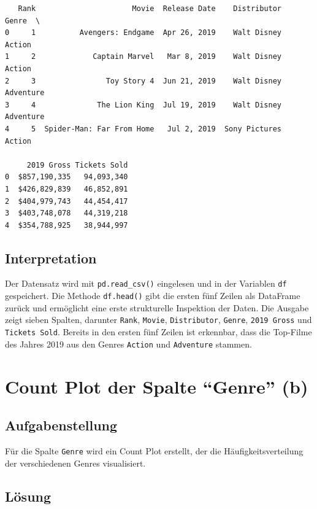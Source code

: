 \begin{verbatim}
   Rank                      Movie  Release Date    Distributor      Genre  \
0     1          Avengers: Endgame  Apr 26, 2019    Walt Disney     Action   
1     2             Captain Marvel   Mar 8, 2019    Walt Disney     Action   
2     3                Toy Story 4  Jun 21, 2019    Walt Disney  Adventure   
3     4              The Lion King  Jul 19, 2019    Walt Disney  Adventure   
4     5  Spider-Man: Far From Home   Jul 2, 2019  Sony Pictures     Action   

     2019 Gross Tickets Sold  
0  $857,190,335   94,093,340  
1  $426,829,839   46,852,891  
2  $404,979,743   44,454,417  
3  $403,748,078   44,319,218  
4  $354,788,925   38,944,997
\end{verbatim}

\subsection{Interpretation}

Der Datensatz wird mit \texttt{pd.read\_csv()} eingelesen und in der Variablen \texttt{df} gespeichert. Die Methode \texttt{df.head()} gibt die ersten fünf Zeilen als DataFrame zurück und ermöglicht eine erste strukturelle Inspektion der Daten. Die Ausgabe zeigt sieben Spalten, darunter \texttt{Rank}, \texttt{Movie}, \texttt{Distributor}, \texttt{Genre}, \texttt{2019 Gross} und \texttt{Tickets Sold}. Bereits in den ersten fünf Zeilen ist erkennbar, dass die Top-Filme des Jahres 2019 aus den Genres \texttt{Action} und \texttt{Adventure} stammen.

\cleardoublepage


\section{Count Plot der Spalte ``Genre'' (b)}
\label{sec:1b}

\subsection{Aufgabenstellung}

Für die Spalte \texttt{Genre} wird ein Count Plot erstellt, der die Häufigkeitsverteilung der verschiedenen Genres visualisiert.

\subsection{Lösung}

